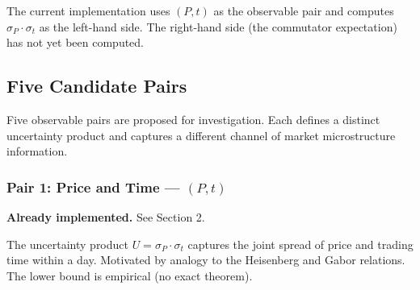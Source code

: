 \documentclass[11pt]{article}
\begin{document}
The current implementation uses $(P, t)$ as the observable pair and computes $\sigma_P \cdot \sigma_t$ as the left-hand side. The right-hand side (the commutator expectation) has not yet been computed.

\subsection{Five Candidate Pairs}

Five observable pairs are proposed for investigation. Each defines a distinct uncertainty product and captures a different channel of market microstructure information.

\begin{table}[htbp]
\centering
\caption{Candidate Robertson pairs, their market interpretation, and data requirements}
\end{table}

\subsubsection{Pair 1: Price and Time --- $(P, t)$}

\textbf{Already implemented.} See Section 2.

The uncertainty product $U = \sigma_P \cdot \sigma_t$ captures the joint spread of price and trading time within a day. Motivated by analogy to the Heisenberg and Gabor relations. The lower bound is empirical (no exact theorem).
\end{document}

